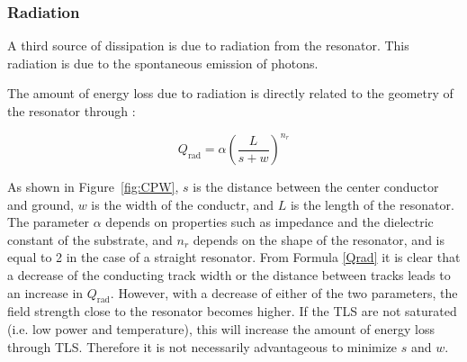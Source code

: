 



    \subsubsection{Radiation}

      A third source of dissipation is due to radiation from the resonator. This radiation is due to the spontaneous emission of photons.

      The amount of energy loss due to radiation is directly related to the geometry of the resonator through \cite{sage2011study,Mazin}:

      \begin{equation}
          Q_\text{rad} = \alpha \left( \frac{L}{s + w}\right)^{n_r}
          \label{Qrad}
      \end{equation}

      As shown in Figure~\ref{fig:CPW}, $s$ is the distance between the center conductor and ground, $w$ is the width of the conductr, and $L$ is the length of the resonator. The parameter $\alpha$ depends on properties such as impedance and the dielectric constant of the substrate, and $n_r$ depends on the shape of the resonator, and is equal to 2 in the case of a straight resonator. From Formula \ref{Qrad} it is clear that a decrease of the conducting track width or the distance between tracks leads to an increase in $Q_\text{rad}$. However, with a decrease of either of the two parameters, the field strength close to the resonator becomes higher. If the TLS are not saturated (i.e. low power and temperature), this will increase the amount of energy loss through TLS. Therefore it is not necessarily advantageous to minimize $s$ and $w$.

